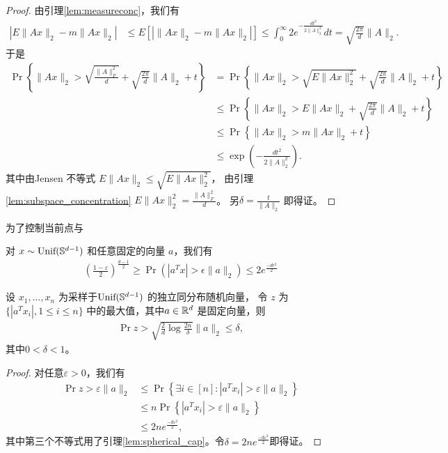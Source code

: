 \documentclass{ctexart}
\begin{document}
\begin{proof}
  由引理\ref{lem:measureconc}，我们有
  \begin{align*}
    \left| E\|A x\|_2 - m\|A x\|_2 \right| &\le E\left[ \left| \|A x\|_2 - m\|A x\|_2 \right| \right] \le \int_0^\infty 2e^{-\frac{dt^2}{2\|A\|_2^2}} dt = \sqrt{\frac{2\pi}{d}} \|A\|_2.
  \end{align*}
  于是
  \begin{align*}
    \Pr \left\{ \|A x\|_2 > \sqrt{\frac{\|A\|_F^2}{d}} + \sqrt{\frac{2\pi}{d}} \|A\|_2 + t \right\}
    &= \Pr \left\{ \|A x\|_2 > \sqrt{E\|A x\|_2^2} + \sqrt{\frac{2\pi}{d}} \|A\|_2 + t \right\} \\
    &\le \Pr \left\{ \|A x\|_2 > E\|A x\|_2 + \sqrt{\frac{2\pi}{d}} \|A\|_2 + t \right\} \\
    &\le \Pr \left\{ \|A x\|_2 > m\|A x\|_2 + t \right\} \\
    &\le \exp \left( -\frac{dt^2}{2 \|A\|_2^2} \right).
  \end{align*}
  其中由Jensen 不等式 $ E\|A x\|_2 \le \sqrt{E\|Ax\|_2^2}$，
  由引理\ref{lem:subspace_concentration} $E \|Ax\|_2^2=\frac{\|A\|_F^2}{d}$。
  另$\delta = \frac{t}{\|A\|_2}$ 即得证。
\end{proof}

为了控制当前点与
\begin{lemma}\label{lem:spherical_cap}
  对 $x \sim \text{Unif}(\S^{d-1})$ 和任意固定的向量 $a$，我们有
  \begin{align*}
    \left( \frac{1-\varepsilon}{2} \right)^{\frac{d-1}{2}} \ge
    \Pr\left(|a^Tx|>\epsilon \|a\|_2\right) \leq 2e^{\frac{-d\epsilon^2}{2}}
  \end{align*}
\end{lemma}

\begin{lemma} \label{lem:projbound_upper}
  设 $x_1, \ldots, x_n $ 为采样于$\text{Unif}(\S^{d-1})$ 的独立同分布随机向量，
  令 $z$ 为 $\{ |a^T x_i|, 1 \le i \le n\}$
  中的最大值，其中$a \in \R^d $ 是固定向量，则
  \begin{align*}
    \Pr{z>\sqrt{\frac{2}{d} \log \frac{2n}{\delta}} \|a\|_2} \le \delta,
  \end{align*}
  其中$0<\delta<1$。
\end{lemma}

\begin{proof}
  对任意$\varepsilon>0$，我们有
  \begin{align*}
    \Pr{z > \varepsilon \|a\|_2} &\le \Pr\left\{\exists i \in [n] : |a^T
    x_i|>\varepsilon \|a\|_2 \right\} \\
    &\le n \Pr\left\{ |a^T x_i|>\varepsilon \|a\|_2\right\} \\
    &\le 2n e^{\frac{-d\varepsilon^2}{2}},
  \end{align*}
  其中第三个不等式用了引理\ref{lem:spherical_cap}。令$\delta=2n
  e^{\frac{-d\varepsilon^2}{2}}$即得证。
\end{proof}
\end{document}
